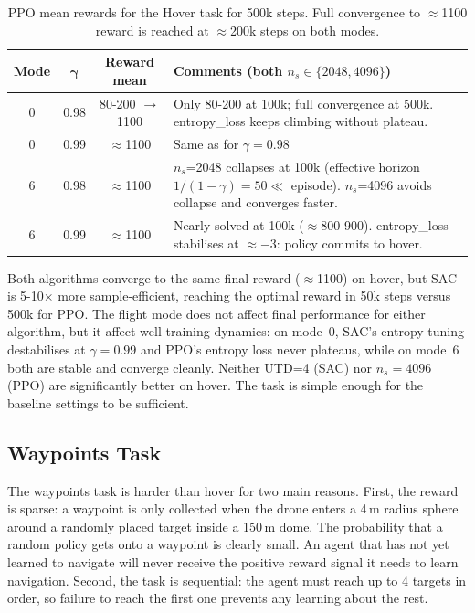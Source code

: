 \documentclass[11pt,a4paper]{article}
\begin{document}
\begin{table}[H]
\centering
\small
\renewcommand{\arraystretch}{1.35}
\begin{tabular}{@{} c c c >{\centering\arraybackslash}p{6.2cm} @{}}
\toprule
\textbf{Mode} & $\boldsymbol{\gamma}$ & \textbf{Reward mean} &  \textbf{Comments (both $n_s \in \{2048,4096\}$)} \\
\midrule
0 & 0.98 & 80-200 $\to$ 1100 & 
  Only 80-200 at 100k; full convergence at 500k. entropy\_loss keeps climbing without plateau. \\
0 & 0.99 & $\approx$1100 & Same as for $\gamma = 0.98$ \\[6pt]
\midrule
6 & 0.98 & $\approx$1100 & 
  $n_s$=2048 collapses at 100k (effective horizon $1/(1{-}\gamma)=50 \ll$ episode). $n_s$=4096 avoids collapse and converges faster. \\
6 & 0.99 & $\approx$1100 & 
  Nearly solved at 100k ($\approx$800-900). entropy\_loss stabilises at $\approx{-3}$: policy commits to hover. \\
\bottomrule
\end{tabular}
\caption{PPO mean rewards for the Hover task for 500k steps. Full convergence to $\approx$1100 reward is reached at $\approx$200k steps on both modes.}
\label{tab:hover-ppo}
\end{table}

\pagebreak

Both algorithms converge to the same final reward ($\approx$1100) on hover, but SAC is 5-10$\times$ more sample-efficient, reaching the optimal reward in 50k steps versus 500k for PPO. The flight mode does not affect final performance for either algorithm, but it affect well training dynamics: on mode~0, SAC's entropy tuning destabilises at $\gamma=0.99$ and PPO's entropy loss never plateaus, while on mode~6 both are stable and converge cleanly. Neither UTD=4 (SAC) nor $n_s=4096$ (PPO) are significantly better on hover. The task is simple enough for the baseline settings to be sufficient.

\subsection{Waypoints Task}

The waypoints task is harder than hover for two main reasons. First, the reward is sparse: a waypoint is only collected when the drone enters a 4\,m radius sphere around a randomly placed target inside a 150\,m dome. The probability that a random policy gets onto a waypoint is clearly small. An agent that has not yet learned to navigate will never receive the positive reward signal it needs to learn navigation. Second, the task is sequential: the agent must reach up to 4 targets in order, so failure to reach the first one prevents any learning about the rest. \\
\end{document}
